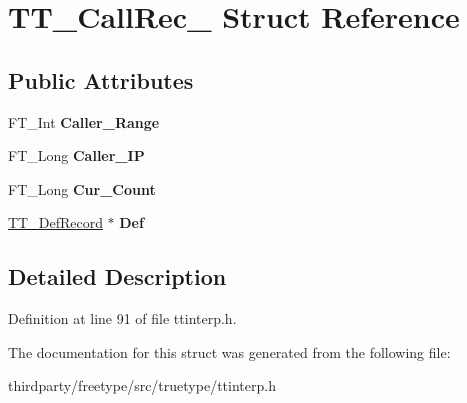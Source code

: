 \hypertarget{struct_t_t___call_rec__}{}\section{T\+T\+\_\+\+Call\+Rec\+\_\+ Struct Reference}
\label{struct_t_t___call_rec__}
\subsection*{Public Attributes}
\begin{DoxyCompactItemize}
\item 
\mbox{\label{struct_t_t___call_rec___a631d8a3ed7df56582a05644fad2d953a}} 
F\+T\+\_\+\+Int {\bfseries Caller\+\_\+\+Range}
\item 
\mbox{\label{struct_t_t___call_rec___abeb634c5ccf5f837a4d7b5a6289e0458}} 
F\+T\+\_\+\+Long {\bfseries Caller\+\_\+\+IP}
\item 
\mbox{\label{struct_t_t___call_rec___a7efaaca0de69401a535b4e93c4301040}} 
F\+T\+\_\+\+Long {\bfseries Cur\+\_\+\+Count}
\item 
\mbox{\label{struct_t_t___call_rec___aebe4a36ee4e43ccd8966fb49221d0ca6}} 
\hyperlink{struct_t_t___def_record__}{T\+T\+\_\+\+Def\+Record} $\ast$ {\bfseries Def}
\end{DoxyCompactItemize}


\subsection{Detailed Description}


Definition at line 91 of file ttinterp.\+h.



The documentation for this struct was generated from the following file\+:\begin{DoxyCompactItemize}
\item 
thirdparty/freetype/src/truetype/ttinterp.\+h\end{DoxyCompactItemize}
